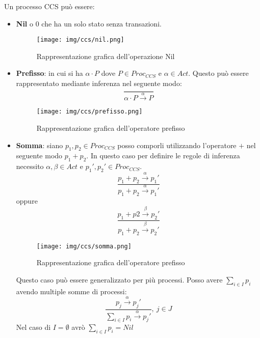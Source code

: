 Un processo CCS può essere:
\begin{itemize}
    \item \textbf{Nil} o 0 che ha un solo stato senza transazioni.
          \begin{figure}[!ht]
              \centering
              \texttt{[image: img/ccs/nil.png]}
              \caption{Rappresentazione grafica dell'operazione Nil}
          \end{figure}
    \item \textbf{Prefisso}: in cui si ha $\alpha \cdot P$ dove $P \in Proc_{CCS}$
          e $\alpha \in Act$. Questo può essere rappresentato mediante inferenza nel
          seguente modo: $$\frac{}{\alpha \cdot P \xrightarrow{\alpha} P}$$
          \begin{figure}[!ht]
              \centering
              \texttt{[image: img/ccs/prefisso.png]}
              \caption{Rappresentazione grafica dell'operatore prefisso}
          \end{figure}
    \item \textbf{Somma}: siano $p_1, p_2 \in Proc_{CCS}$ posso comporli utilizzando
          l'operatore $+$ nel seguente modo $p_1 + p_2$. In questo caso per definire
          le regole di inferenza necessito $\alpha, \beta \in Act$ e $p_1', p_2' \in Proc_{CCS}$.
          $$\frac{p_1 + p_2 \xrightarrow{\alpha} p_1'}{p_1 + p_2 \xrightarrow{\alpha} p_1'}$$
          oppure $$\frac{p_1 + p2 \xrightarrow{\beta} p_2'}{p_1 + p_2 \xrightarrow{\beta} p_2'}$$
          \begin{figure}[!ht]
              \centering
              \texttt{[image: img/ccs/somma.png]}
              \caption{Rappresentazione grafica dell'operatore prefisso}
          \end{figure}
          Questo caso può essere generalizzato per più processi. Posso avere
          $\sum_{i \in I} p_i$ avendo multiple somme di processi:
          $$\frac{p_j \xrightarrow{\alpha} p_j'}{\sum_{i \in I} p_i \xrightarrow{\alpha} p_j'}, \ j \in J$$
          Nel caso di $I = \emptyset$ avrò $\sum_{i \in I} p_i = Nil$


\end{itemize}
